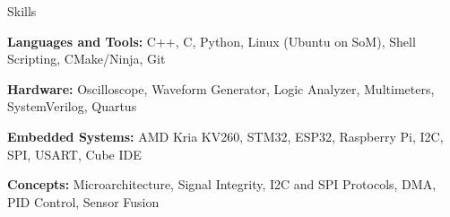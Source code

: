 \documentclass{template} %
\begin{document}

\begin{rSection}{Skills}
\vspace{0.1em}
  \begin{rSummarySection}
{
\item \textbf{Languages and Tools:} C++, C, Python, Linux (Ubuntu on SoM), Shell Scripting, CMake/Ninja, Git\vspace{0.2em}
    \item \textbf{Hardware:} Oscilloscope, Waveform Generator, Logic Analyzer, Multimeters, SystemVerilog, Quartus\vspace{0.2em}
    \item \textbf{Embedded Systems:} AMD Kria KV260, STM32, ESP32, Raspberry Pi, I2C, SPI, USART, Cube IDE\vspace{0.2em}
    \item \textbf{Concepts:} Microarchitecture, Signal Integrity, I2C and SPI Protocols, DMA, PID Control, Sensor Fusion 

  }
  \end{rSummarySection}
\end{rSection}
\vspace{0.3em}
\end{document}
